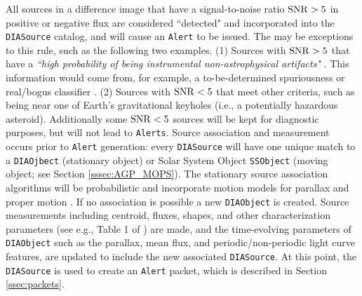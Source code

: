 All sources in a difference image that have a signal-to-noise ratio ${\rm SNR}>5$ in positive or negative flux are considered ``detected" and incorporated into the {\tt DIASource} catalog, and will cause an {\tt Alert} to be issued. The may be exceptions to this rule, such as the following two examples. (1) Sources with ${\rm SNR} > 5$ that have a {\it ``high probability of being instrumental non-astrophysical artifacts"} . This information would come from, for example, a to-be-determined spuriousness or real/bogus classifier . (2) Sources with ${\rm SNR} < 5$ that meet other criteria, such as being near one of Earth's gravitational keyholes (i.e., a potentially hazardous asteroid). Additionally some ${\rm SNR} < 5$ sources will be kept for diagnostic purposes, but will not lead to {\tt Alerts}. Source association and measurement occurs prior to {\tt Alert} generation: every {\tt DIASource} will have one unique match to a {\tt DIAOjbect} (stationary object) or Solar System Object {\tt SSObject} (moving object; see Section \ref{sssec:AGP_MOPS}). The stationary source association algorithms will be probabilistic and incorporate motion models for parallax and proper motion . If no association is possible a new {\tt DIAObject} is created. Source measurements including centroid, fluxes, shapes, and other characterization parameters (see e.g., Table 1 of ) are made, and the time-evolving parameters of {\tt DIAObject} such as the parallax, mean flux, and periodic/non-periodic light curve features, are updated to include the new associated {\tt DIASource}. At this point, the {\tt DIASource} is used to create an {\tt Alert} packet, which is described in Section \ref{ssec:packets}.

